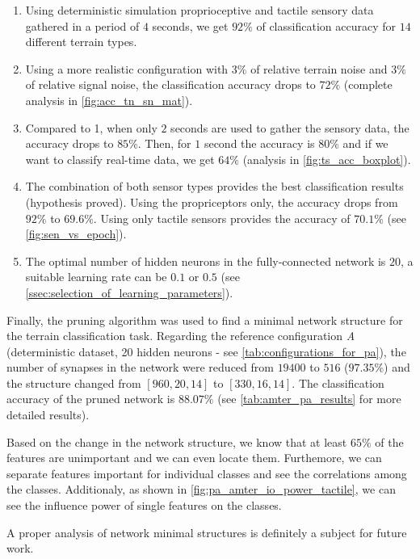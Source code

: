 \begin{enumerate}
\item Using deterministic simulation proprioceptive and tactile sensory data gathered in a period of $ 4 $ seconds, we get $ 92\% $ of classification accuracy for $ 14 $ different terrain types.
\item Using a more realistic configuration with $ 3\% $ of relative terrain noise and $ 3\% $ of relative signal noise, the classification accuracy drops to $ 72\% $ (complete analysis in \cref{fig:acc_tn_sn_mat}).
\item Compared to 1, when only $ 2 $ seconds are used to gather the sensory data, the accuracy drops to $ 85\% $. Then, for $ 1 $ second the accuracy is $ 80\% $ and if we want to classify real-time data, we get $ 64\% $ (analysis in \cref{fig:ts_acc_boxplot}).
\item The combination of both sensor types provides the best classification results (hypothesis proved). Using the propriceptors only, the accuracy drops from $ 92\% $ to $69.6\%$. Using only tactile sensors provides the accuracy of $ 70.1\% $ (see \cref{fig:sen_vs_epoch}).
\item The optimal number of hidden neurons in the fully-connected network is $ 20 $, a suitable learning rate can be $ 0.1 $ or $ 0.5 $ (see \cref{ssec:selection_of_learning_parameters}).
\end{enumerate}

Finally, the pruning algorithm was used to find a minimal network structure for the terrain classification task. Regarding the reference configuration \textit{A} (deterministic dataset, 20 hidden neurons - see \ref{tab:configurations_for_pa}), the number of synapses in the network were reduced from $ 19400 $ to $ 516 $ ($ 97.35\% $) and the structure changed from $ [960, 20, 14] $ to $ [330, 16, 14] $. The classification accuracy of the pruned network is $ 88.07\% $ (see \cref{tab:amter_pa_results} for more detailed results).

Based on the change in the network structure, we know that at least $ 65\% $ of the features are unimportant and we can even locate them. Furthemore, we can separate features important for individual classes and see the correlations among the classes. Additionaly, as shown in \cref{fig:pa_amter_io_power_tactile}, we can see the influence power of single features on the classes.

A proper analysis of network minimal structures is definitely a subject for future work.

